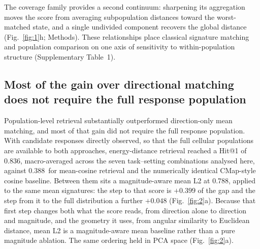 \documentclass[11pt,letterpaper]{article}
\newcommand{\HITENERGY}{0.836}
\newcommand{\HITMAG}{0.788}
\newcommand{\HITMEAN}{0.388}
\newcommand{\HITSTEPMAG}{+0.399}
\newcommand{\HITSTEPDIST}{+0.048}
\begin{document}
The coverage family provides a second continuum: sharpening its aggregation moves the score from averaging subpopulation distances toward the worst-matched state, and a single undivided component recovers the global distance (Fig.~\ref{fig:1}h; Methods). These relationships place classical signature matching and population comparison on one axis of sensitivity to within-population structure (Supplementary Table~1).


\subsection*{Most of the gain over directional matching does not require the full response population}

Population-level retrieval substantially outperformed direction-only mean matching, and most of that gain did not require the full response population. With candidate responses directly observed, so that the full cellular populations are available to both approaches, energy-distance retrieval reached a Hit@1 of \HITENERGY, macro-averaged across the seven task--setting combinations analysed here, against \HITMEAN\ for mean-cosine retrieval and the numerically identical CMap-style cosine baseline\cite{ref1,ref2}. Between them sits a magnitude-aware mean L2 at \HITMAG, applied to the same mean signatures: the step to that score is $\HITSTEPMAG$ of the gap and the step from it to the full distribution a further $\HITSTEPDIST$ (Fig.~\ref{fig:2}a). Because that first step changes both what the score reads, from direction alone to direction and magnitude, and the geometry it uses, from angular similarity to Euclidean distance, mean L2 is a magnitude-aware mean baseline rather than a pure magnitude ablation. The same ordering held in PCA space (Fig.~\ref{fig:2}a).
\end{document}
